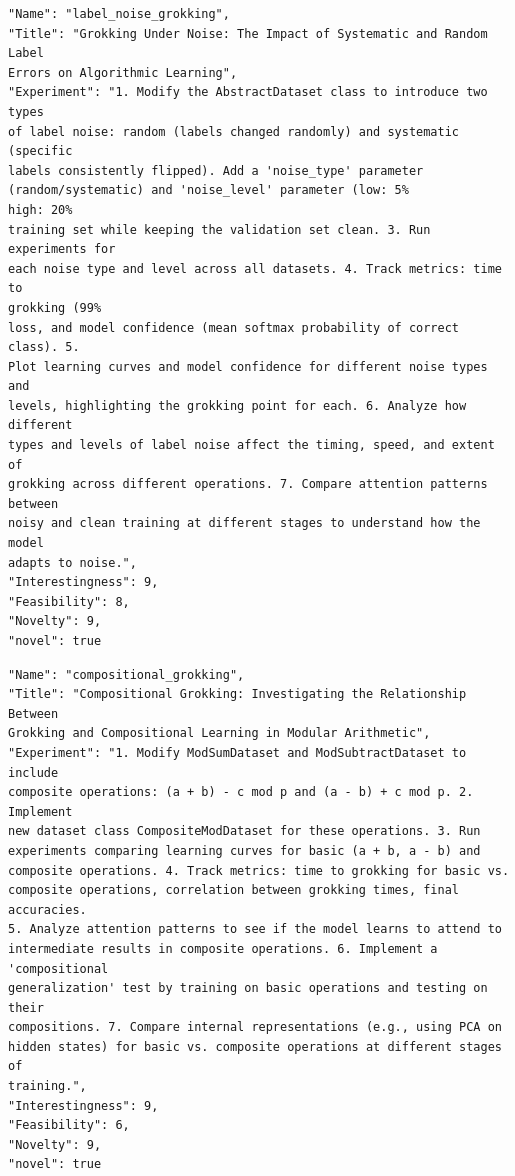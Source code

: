\begin{tcolorbox}[breakable,colback=blue!5!white, colframe=blue!75!black, title=Idea 13/50 - \texttt{label\_noise\_grokking}]
\small
\begin{verbatim}
"Name": "label_noise_grokking",
"Title": "Grokking Under Noise: The Impact of Systematic and Random Label
Errors on Algorithmic Learning",
"Experiment": "1. Modify the AbstractDataset class to introduce two types
of label noise: random (labels changed randomly) and systematic (specific
labels consistently flipped). Add a 'noise_type' parameter
(random/systematic) and 'noise_level' parameter (low: 5%
high: 20%
training set while keeping the validation set clean. 3. Run experiments for
each noise type and level across all datasets. 4. Track metrics: time to
grokking (99%
loss, and model confidence (mean softmax probability of correct class). 5.
Plot learning curves and model confidence for different noise types and
levels, highlighting the grokking point for each. 6. Analyze how different
types and levels of label noise affect the timing, speed, and extent of
grokking across different operations. 7. Compare attention patterns between
noisy and clean training at different stages to understand how the model
adapts to noise.",
"Interestingness": 9,
"Feasibility": 8,
"Novelty": 9,
"novel": true
\end{verbatim}
\end{tcolorbox}

\begin{tcolorbox}[breakable,colback=blue!5!white, colframe=blue!75!black, title=Idea 14/50 - \texttt{compositional\_grokking}]
\small
\begin{verbatim}
"Name": "compositional_grokking",
"Title": "Compositional Grokking: Investigating the Relationship Between
Grokking and Compositional Learning in Modular Arithmetic",
"Experiment": "1. Modify ModSumDataset and ModSubtractDataset to include
composite operations: (a + b) - c mod p and (a - b) + c mod p. 2. Implement
new dataset class CompositeModDataset for these operations. 3. Run
experiments comparing learning curves for basic (a + b, a - b) and
composite operations. 4. Track metrics: time to grokking for basic vs.
composite operations, correlation between grokking times, final accuracies.
5. Analyze attention patterns to see if the model learns to attend to
intermediate results in composite operations. 6. Implement a 'compositional
generalization' test by training on basic operations and testing on their
compositions. 7. Compare internal representations (e.g., using PCA on
hidden states) for basic vs. composite operations at different stages of
training.",
"Interestingness": 9,
"Feasibility": 6,
"Novelty": 9,
"novel": true
\end{verbatim}
\end{tcolorbox}

